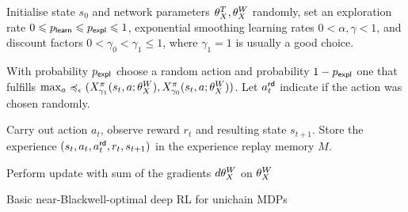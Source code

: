 \documentclass[envcountsame]{llncs}
\begin{document}
\begin{algorithm}[t!]
  \begin{algorithmic}[1]
    \State{}Initialise state \(s_{0}\) and network parameters \(\theta_X^{T}, \theta_X^{W}\) randomly, set
    an exploration rate \(0 \leqslant p_{\mathsf{learn}} \leqslant p_{\mathsf{expl}} \leqslant 1\), exponential smoothing learning rates
    \(0 < \alpha, \gamma < 1\), and discount factors
    \(0 < \gamma_{0} < \gamma_{1} \leqslant 1\), where \(\gamma_{1} = 1\) is
    usually a good choice.
    \State{}\begin{minipage}[t]{\dimexpr\textwidth-\leftmargin-\labelsep-\labelwidth}
      With probability \(p_{\mathsf{expl}}\) choose a random action and
      probability \(1-p_{\mathsf{expl}}\) one that fulfills
      \(\max_{a}\preccurlyeq_{\epsilon}(X^{\pi}_{\gamma_{1}}(s_{t},a; \theta_X^{W}{}),X^\pi_ {\gamma_{0}}(s_{t},a; \theta_X^{W}{}))\). Let
      \(a_{t}^{\mathsf{rd}}\) indicate if the action was chosen randomly.
    \end{minipage}
    \State{}\begin{minipage}[t]{\dimexpr\textwidth-\leftmargin-\labelsep-\labelwidth}
    Carry out action \(a_{t}\), observe reward \(r_{t}\) and resulting state \(s_{t+1}\).
    Store the experience \((s_{t}, a_{t}, a_{t}^{\mathsf{rd}}, r_{t}, s_{t+1})\) in the experience replay
    memory \(M\).
    \end{minipage}
    \EndIf
    \EndFor
    \State{}%
    \begin{minipage}[t]{\dimexpr\textwidth-\leftmargin-\labelsep-\labelwidth}
      Perform update with sum of the gradients \(d\theta_X^{W}{}\) on \(\theta_X^{W}{}\)
    \end{minipage}
    \EndWhile{}
  \end{algorithmic}
  \caption{\label{alg:near}Basic near-Blackwell-optimal deep RL for unichain MDPs}
\end{algorithm}
\end{document}
